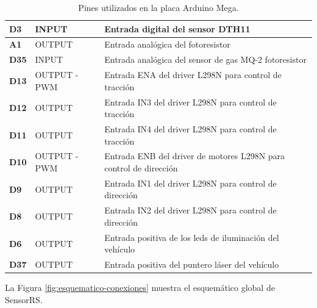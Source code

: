 \begin{table}[H]
  \begin{center}
    \begin{tabular}{|p{2.5cm}|p{4cm}|p{6cm}|}
      \hline
      {\textbf{ D3 }} & { INPUT } & { Entrada digital del sensor DTH11 } \\
      \hline      
      {\textbf{ A1 }} & { OUTPUT } & { Entrada analógica del fotoresistor } \\      
      \hline	  
      {\textbf{ D35 }} & { INPUT } & { Entrada analógica del sensor de gas MQ-2 fotoresistor } \\            
      \hline
      {\textbf{ D13 }} & { OUTPUT - PWM } & { Entrada ENA del driver L298N para control de tracción } \\
      \hline
      {\textbf{ D12 }} & { OUTPUT } & { Entrada IN3 del driver L298N para control de tracción } \\
      \hline
      {\textbf{ D11 }} & { OUTPUT } & { Entrada IN4 del driver L298N para control de tracción } \\      
      \hline
      {\textbf{ D10 }} & { OUTPUT - PWM } & { Entrada ENB del driver de motores L298N para control de dirección } \\
      \hline
      {\textbf{ D9 }} & { OUTPUT } & { Entrada IN1 del driver L298N para control de dirección } \\
      \hline
      {\textbf{ D8 }} & { OUTPUT } & { Entrada IN2 del driver L298N para control de dirección } \\      
      \hline
      {\textbf{ D6 }} & { OUTPUT } & { Entrada positiva de los leds de iluminación del vehículo } \\      
      \hline
      {\textbf{ D37 }} & { OUTPUT } & { Entrada positiva del puntero láser del vehículo } \\      
     \hline   
    \end{tabular}
  \end{center}
\caption{ Pines utilizados en la placa Arduino Mega. }
\label{table:pines_utilizados}
\end{table}

La Figura \ref{fig:esquematico-conexiones} muestra el esquemático global de SensorRS.\\

